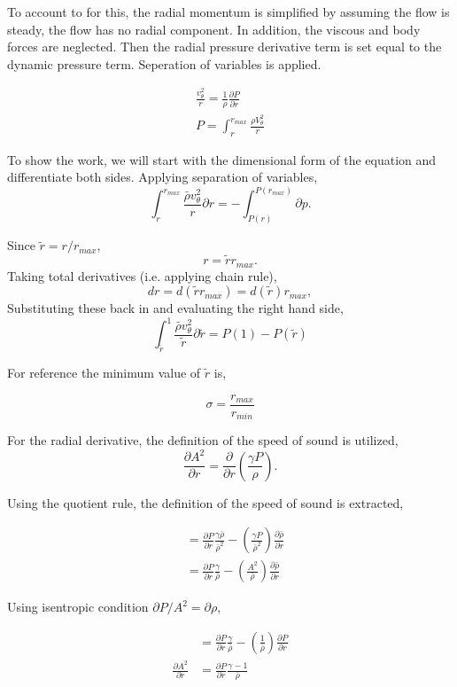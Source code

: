 \documentclass[12pt]{article}
\begin{document}
 To account to for this, the radial momentum is simplified by assuming the 
 flow is steady, the flow has no radial component. In addition, the viscous
 and body forces are neglected.  Then the radial pressure derivative term is
 set equal to the dynamic pressure term. Seperation of variables is applied.  

 \begin{align*}
     \frac{v_{\theta}^2}{r} = \frac{1}{\rho}\frac{\partial P}{\partial r} \\
 P = \int_{r}^{r_{max}} \frac{\rho V_{\theta}^2}{  r}
 \end{align*}

To show the work, we will start with the dimensional form of the equation and
differentiate both sides.  Applying separation of variables,
 \[
     \int_{r}^{r_{max}}
     \frac{\bar{\rho} v_{\theta}^2}{r} \partial r 
     =-\int_{P(r)}^{P(r_{max})}\partial p.
 \]

Since $\tilde{r} = r/r_{max}$,
\[r = \tilde{r}r_{max}.\]
Taking total derivatives (i.e. applying chain rule),
\[dr = d(\tilde{r}r_{max}) = d(\tilde{r})r_{max}, \]
Substituting these back in and evaluating the right hand side,
\[
    \int_{\tilde{r}}^{1} \frac{\bar{\rho} v_{\theta}^2}{\tilde{r}}\partial \tilde{r} 
    =P(1)-P(\tilde{r})
\]

For reference the minimum value of $\tilde{r}$ is,

\[\sigma = \frac{r_{max}}{r_{min}}\]

For the radial derivative, the definition of the speed of sound is utilized,
\[\frac{\partial A^2}{\partial r } =
\frac{\partial}{\partial r} \left( \frac{\gamma P}{\rho} \right).\]

Using the quotient rule, the definition of the speed of sound is extracted,

\begin{align*}
&= \frac{\partial P}{\partial r} \frac{\gamma \bar{\rho}}{\bar{\rho}^2} -
\left(
    \frac{\gamma P}{\bar{\rho}^2} 
\right) 
\frac{\partial \bar{\rho}}{\partial r}\\
&=  \frac{\partial P}{\partial r} \frac{\gamma }{\bar{\rho}} -
\left( \frac{A^2}{\bar{\rho}} \right) 
\frac{\partial \bar{\rho} }{\partial r}
\end{align*}

Using isentropic condition $ \partial P/A^2 = \partial \rho$, 

\begin{align*}
&= \frac{\partial P}{\partial r} \frac{\gamma }{\bar{\rho}} -
\left( \frac{1}{\bar{\rho}} \right) \frac{\partial  P }{\partial r}\\
\frac{\partial A^2}{\partial r} 
&= \frac{\partial P}{\partial r} \frac{\gamma - 1}{\bar{\rho}}  
\end{align*}
\end{document}
